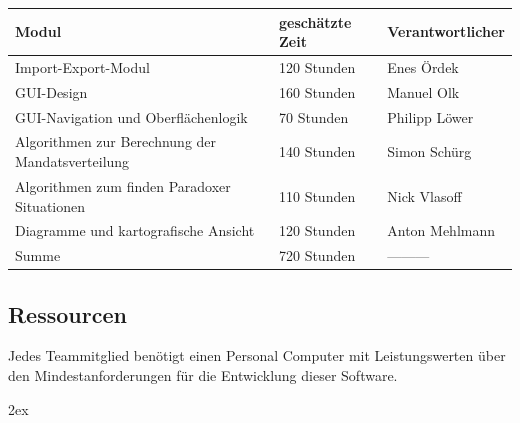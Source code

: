 \documentclass[10pt,a4paper]{article}
\begin{document}
\begin{tabular}[h]{lll}
	\hline
	\textbf{Modul} & \textbf{geschätzte Zeit} & \textbf{Verantwortlicher} \\
	\hline
	Import-Export-Modul & 120 Stunden & Enes Ördek\\
	GUI-Design & 160 Stunden & Manuel Olk \\
	GUI-Navigation und Oberflächenlogik & 70 Stunden &  Philipp Löwer\\
	Algorithmen zur Berechnung der Mandatsverteilung & 140 Stunden &  Simon Schürg\\
	Algorithmen zum finden Paradoxer Situationen  & 110 Stunden &  Nick Vlasoff\\
	Diagramme und kartografische Ansicht  & 120 Stunden &  Anton Mehlmann\\
	\hline
	Summe & 720 Stunden & --------- \\
	\hline
\end{tabular}

\subsection{Ressourcen}
Jedes Teammitglied benötigt einen Personal Computer mit Leistungswerten über den Mindestanforderungen für die Entwicklung dieser Software.

\renewcommand{\notesname}{15 Glossar}


\begingroup
\parindent 0pt
\parskip 2ex
\def\enotesize{\normalsize}
\theendnotes
\endgroup
\end{document}
